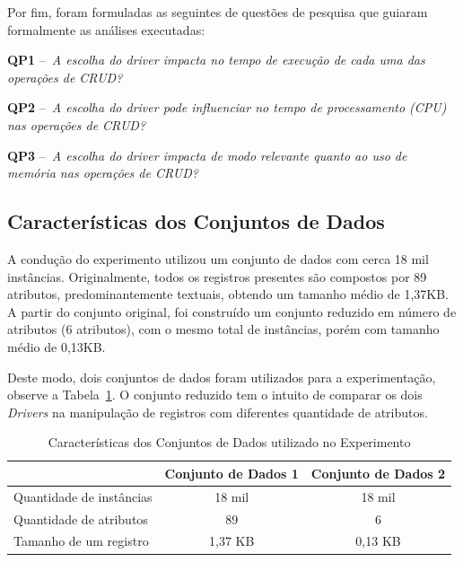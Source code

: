 \documentclass[12pt]{article}
\begin{document}
Por fim, foram formuladas as seguintes de questões de pesquisa que guiaram formalmente as análises executadas: 

\textbf{QP1} --~\emph{A escolha do driver impacta no tempo de execução de cada uma das operações de CRUD?}

\textbf{QP2} --~\emph{A escolha do driver pode influenciar no tempo de processamento (CPU) nas operações de CRUD?}

\textbf{QP3} --~\emph{A escolha do driver impacta de modo relevante quanto ao uso de memória nas operações de CRUD?}

\subsection{Características dos Conjuntos de Dados}

A condução do experimento utilizou um conjunto de dados com cerca 18 mil instâncias.%
Originalmente, todos os registros presentes são compostos por 89 atributos, predominantemente textuais, obtendo um tamanho médio de 1,37KB. 
A partir do conjunto original, foi construído um conjunto reduzido em número de atributos (6 atributos), com o mesmo total de instâncias, porém com tamanho médio de 0,13KB. 

Deste modo, dois conjuntos de dados foram utilizados para a experimentação, observe a Tabela~\ref{tab:conjunto-dados}. 
O conjunto reduzido tem o intuito de comparar os dois \emph{Drivers} na manipulação de registros com diferentes quantidade de atributos.

\begin{table}[ht]
\centering
\caption{Características dos Conjuntos de Dados utilizado no Experimento}
\label{tab:conjunto-dados}
\begin{tabular}{c|c|c|}
\cline{2-3}
                         & \textbf{Conjunto de Dados 1} & \textbf{Conjunto de Dados 2} \\ \hline
\multicolumn{1}{|l|}{Quantidade de instâncias} & 18 mil   		 			& 18 mil            \\ \hline
\multicolumn{1}{|l|}{Quantidade de atributos}  & 89        		 			& 6                  \\ \hline
\multicolumn{1}{|l|}{Tamanho de um registro}   & 1,37 KB        				& 0,13 KB                    \\ \hline
\end{tabular}
\end{table}
\end{document}
